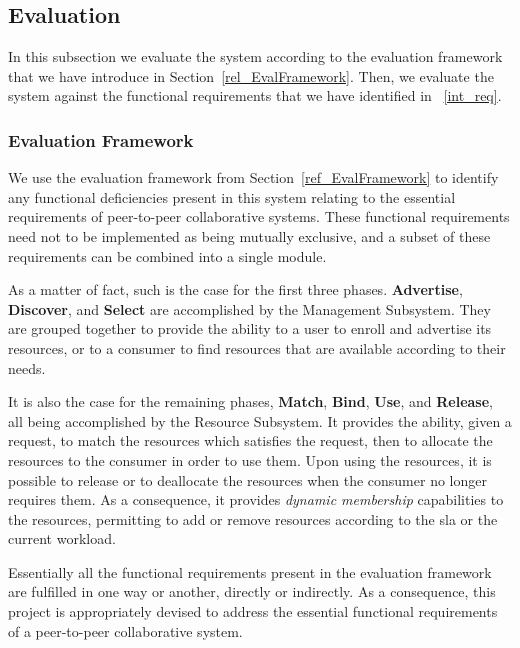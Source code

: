 \documentclass[12pt, titlepage]{uo_temp}
\begin{document}
     \subsection{Evaluation}
     In this subsection we evaluate the system according to the evaluation framework that
     we have introduce in Section~\ref{rel_EvalFramework}. Then, we evaluate the system
     against the functional requirements that we have identified in ~\ref{int_req}.

     \subsubsection{Evaluation Framework}
     We use the evaluation framework from Section~\ref{ref_EvalFramework} to identify any
     functional deficiencies present in this system relating to the essential requirements
     of peer-to-peer collaborative systems. These functional requirements need not to be
     implemented as being mutually exclusive, and a subset of these requirements can be
     combined into a single module.

     As a matter of fact, such is the case for the first three phases. \textbf{Advertise},
     \textbf{Discover}, and \textbf{Select} are accomplished by the Management Subsystem.
     They are grouped together to provide the ability to a user to enroll and
     advertise its resources, or to a consumer to find resources that are available
     according to their needs.

     It is also the case for the remaining phases, \textbf{Match}, \textbf{Bind},
     \textbf{Use}, and \textbf{Release}, all being accomplished by the Resource
     Subsystem. It provides the ability, given a request, to match the resources which
     satisfies the request, then to allocate the resources to the consumer in order to use
     them. Upon using the resources, it is possible to release or to deallocate the
     resources when the consumer no longer requires them. As a consequence, it provides
     \emph{dynamic membership} capabilities to the resources, permitting to add or
     remove resources according to the \gls{sla} or the current workload.
     
     Essentially all the functional requirements present in the evaluation framework are
     fulfilled in one way or another, directly or indirectly. As a consequence, this
     project is appropriately devised to address the essential functional requirements of
     a peer-to-peer collaborative system.
     
\end{document}
